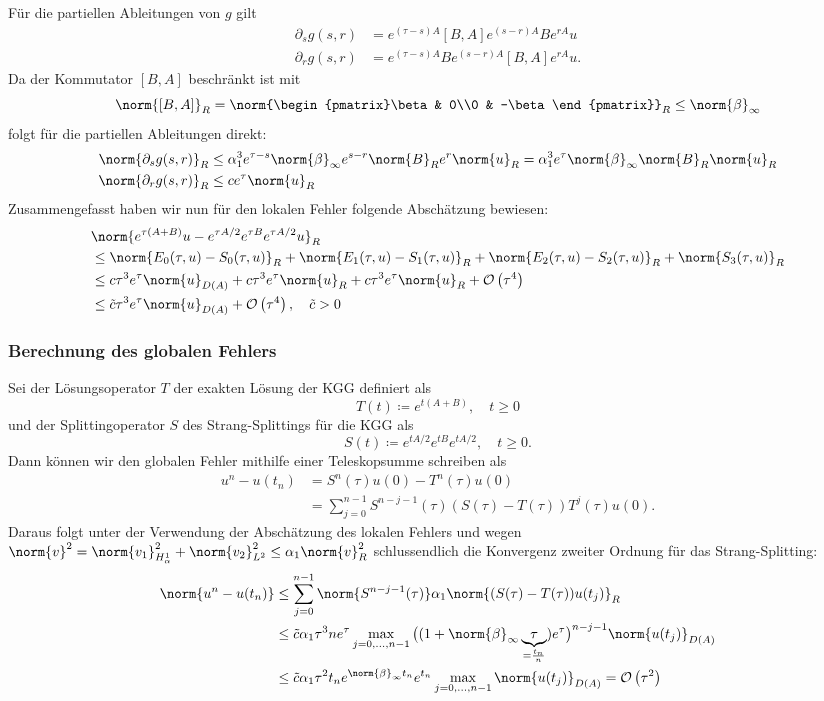 Für die partiellen Ableitungen von $g$ gilt
\begin{align*}
\partial_sg(s,r)&=e^{(\tau-s)A}[B,A]e^{(s-r)A}Be^{rA}u\\
\partial_rg(s,r)&=e^{(\tau-s)A}Be^{(s-r)A}[B,A]e^{rA}u.
\end{align*}
Da der Kommutator $[B,A]$ beschränkt ist mit
\[\norm{[B,A]}_R=\norm{\begin{pmatrix}\beta & 0\\0 & -\beta\end{pmatrix}}_R\le \norm{\beta}_\infty\]
folgt für die partiellen Ableitungen direkt:
\begin{align*}
\norm{\partial_sg(s,r)}_R&\le \alpha_1^3 e^{\tau-s}\norm{\beta}_\infty e^{s-r}\norm{B}_R e^r\norm{u}_R=\alpha_1^3e^\tau\norm{\beta}_\infty\norm{B}_R\norm{u}_R\\
\norm{\partial_rg(s,r)}_R&\le ce^\tau \norm{u}_R
\end{align*}
Zusammengefasst haben wir nun für den lokalen Fehler folgende Abschätzung bewiesen:
\begin{align*}
&\norm{e^{\tau(A+B)}u-e^{\tau A/2}e^{\tau B}e^{\tau A/2}u}_R\\
&\le\norm{E_0(\tau,u)-S_0(\tau,u)}_R
+\norm{E_1(\tau,u)-S_1(\tau,u)}_R
+\norm{E_2(\tau,u)-S_2(\tau,u)}_R
+\norm{S_3(\tau,u)}_R\\
&\le c\tau^3e^\tau\norm{u}_{D(A)}+c\tau^3e^\tau\norm{u}_R+c\tau^3e^\tau\norm{u}_R+\mathcal{O}\left(\tau^4\right)\\
&\le \tilde{c}\tau^3e^\tau \norm{u}_{D(A)}+\mathcal{O}\left(\tau^4\right),\quad \tilde{c}>0
\end{align*}
\subsubsection*{Berechnung des globalen Fehlers}
Sei der Lösungsoperator $T$ der exakten Lösung der KGG definiert als
\[T(t)\coloneqq e^{t(A+B)},\quad t\ge 0\]
und der Splittingoperator $S$ des Strang-Splittings für die KGG als
\[S(t)\coloneqq e^{tA/2}e^{tB}e^{tA/2},\quad t\ge 0.\]
Dann können wir den globalen Fehler mithilfe einer Teleskopsumme schreiben als
\begin{align*}
u^n-u(t_n)&=S^n(\tau)u(0)-T^n(\tau)u(0)\\
&=\sum_{j=0}^{n-1}S^{n-j-1}(\tau)\left(S(\tau)-T(\tau)\right)T^j(\tau)u(0).
\end{align*}
Daraus folgt unter der Verwendung der Abschätzung des lokalen Fehlers und wegen $\norm{v}^2=\norm{v_1}_{H_\alpha^1}^2+\norm{v_2}_{L^2}^2\le \alpha_1 \norm{v}_R^2$ schlussendlich die Konvergenz zweiter Ordnung für das Strang-Splitting:
\begin{align*}
\norm{u^n-u(t_n)}&\le \sum_{j=0}^{n-1}\norm{S^{n-j-1}(\tau)}\alpha_1\norm{(S(\tau)-T(\tau))u(t_j)}_R\\
&\le \tilde{c}\alpha_1\tau^3ne^\tau\max_{j=0,\dots,n-1}\big((1+\norm{\beta}_\infty\underbrace{\tau}_{=\frac{t_n}{n}})e^\tau\big)^{n-j-1}\norm{u(t_j)}_{D(A)}\\
&\le \tilde{c}\alpha_1\tau^2t_ne^{\norm{\beta}_\infty t_n}e^{t_n}\max_{j=0,\dots,n-1}\norm{u(t_j)}_{D(A)}
=\mathcal{O}\left(\tau^2\right)
\end{align*}
